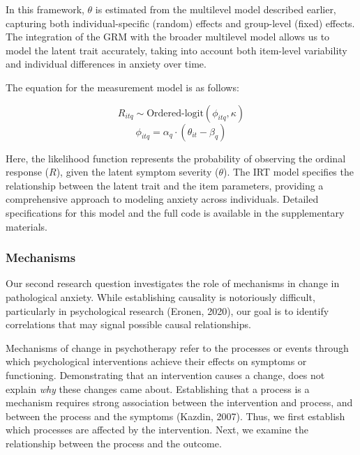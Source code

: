 \documentclass[
  man,floatsintext]{apa7}
\begin{document}
In this framework, \(\theta\) is estimated from the multilevel model described earlier, capturing both individual-specific (random) effects and group-level (fixed) effects.
The integration of the GRM with the broader multilevel model allows us to model the latent trait accurately, taking into account both item-level variability and individual differences in anxiety over time.

The equation for the measurement model is as follows:

\[R_{itq} \sim \text{Ordered-logit}(\phi_{itq}, \kappa)\]
\[\phi_{itq} = \alpha_q \cdot (\theta_{it} - \beta_q)\]

Here, the likelihood function represents the probability of observing the ordinal response (\(R\)), given the latent symptom severity (\(\theta\)).
The IRT model specifies the relationship between the latent trait and the item parameters, providing a comprehensive approach to modeling anxiety across individuals.
Detailed specifications for this model and the full code is available in the supplementary materials.

\subsubsection{Mechanisms}\label{mechanisms}

Our second research question investigates the role of mechanisms in change in pathological anxiety.
While establishing causality is notoriously difficult, particularly in psychological research (Eronen, 2020), our goal is to identify correlations that may signal possible causal relationships.

Mechanisms of change in psychotherapy refer to the processes or events through which psychological interventions achieve their effects on symptoms or functioning.
Demonstrating that an intervention causes a change, does not explain \emph{why} these changes came about.
Establishing that a process is a mechanism requires strong association between the intervention and process, and between the process and the symptoms (Kazdin, 2007).
Thus, we first establish which processes are affected by the intervention.
Next, we examine the relationship between the process and the outcome.
\end{document}
